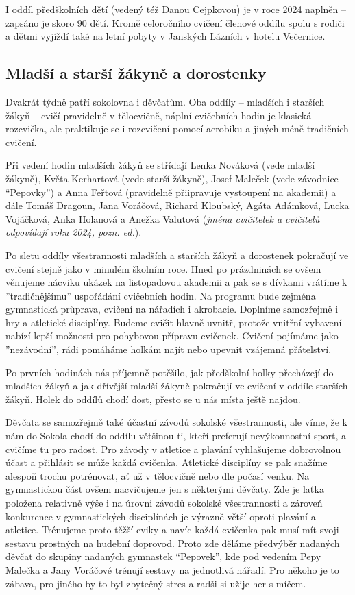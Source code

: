 I oddíl předškolních dětí (vedený též Danou Cejpkovou) je v roce 2024
naplněn -- zapsáno je skoro 90 dětí. Kromě celoročního cvičení členové
oddílu spolu s rodiči a dětmi vyjíždí také na letní pobyty v Janských
Lázních v hotelu Večernice.

\subsection{Mladší a starší žákyně a
dorostenky}\label{mladux161uxed-a-starux161uxed-ux17euxe1kynux11b-a-dorostenky}

Dvakrát týdně patří sokolovna i děvčatům. Oba oddíly -- mladších i
starších žákyň -- cvičí pravidelně v tělocvičně, náplní cvičebních hodin
je klasická rozcvička, ale praktikuje se i rozcvičení pomocí aerobiku a
jiných méně tradičních cvičení.

Při vedení hodin mladších žákyň se střídají Lenka Nováková (vede mladší
žákyně), Květa Kerhartová (vede starší žákyně), Josef Maleček (vede
závodnice ``Pepovky'') a Anna Feřtová (pravidelně přiipravuje vystoupení
na akademii) a dále Tomáš Dragoun, Jana Voráčová, Richard Kloubský,
Agáta Adámková, Lucka Vojáčková, Anka Holanová a Anežka Valutová
(\emph{jména cvičitelek a cvičitelů odpovídají roku 2024, pozn. ed.}).

Po sletu oddíly všestrannosti mladších a starších žákyň a dorostenek
pokračují ve cvičení stejně jako v minulém školním roce. Hned po
prázdninách se ovšem věnujeme nácviku ukázek na listopadovou akademii a
pak se s dívkami vrátíme k ''tradičnějšímu'' uspořádání cvičebních
hodin. Na programu bude zejména gymnastická průprava, cvičení na
nářadích i akrobacie. Doplníme samozřejmě i hry a atletické disciplíny.
Budeme cvičit hlavně uvnitř, protože vnitřní vybavení nabízí lepší
možnosti pro pohybovou přípravu cvičenek. Cvičení pojímáme jako
''nezávodní'', rádi pomáháme holkám najít nebo upevnit vzájemná
přátelství.

Po prvních hodinách nás příjemně potěšilo, jak předškolní holky
přecházejí do mladších žákyň a jak dřívější mladší žákyně pokračují ve
cvičení v oddíle starších žákyň. Holek do oddílů chodí dost, přesto se u
nás místa ještě najdou.

Děvčata se samozřejmě také účastní závodů sokolské všestrannosti, ale
víme, že k nám do Sokola chodí do oddílu většinou ti, kteří preferují
nevýkonnostní sport, a cvičíme tu pro radost. Pro závody v atletice a
plavání vyhlašujeme dobrovolnou účast a přihlásit se může každá
cvičenka. Atletické disciplíny se pak snažíme alespoň trochu potrénovat,
ať už v tělocvičně nebo dle počasí venku. Na gymnastickou část ovšem
nacvičujeme jen s některými děvčaty. Zde je laťka položena relativně
výše i na úrovni závodů sokolské všestrannosti a zároveň konkurence v
gymnastických disciplínách je výrazně větší oproti plavání a atletice.
Trénujeme proto těžší cviky a navíc každá cvičenka pak musí mít svoji
sestavu prostných na hudební doprovod. Proto zde děláme předvýběr
nadaných děvčat do skupiny nadaných gymnastek ``Pepovek'', kde pod
vedením Pepy Malečka a Jany Voráčové trénují sestavy na jednotlivá
nářadí. Pro někoho je to zábava, pro jiného by to byl zbytečný stres a
radši si užije her s míčem.

